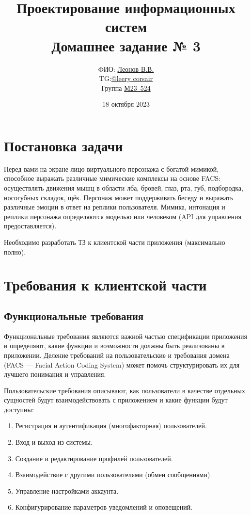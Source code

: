 \documentclass[a4paper,14pt]{extarticle}
\title{Проектирование информационных систем  \\
Домашнее задание № 3}
\author{ФИО: \underline{Леонов В.В.}\\TG:\underline{@leery\underline{ }corsair}\\Группа \underline{М23--524}}
\date{18 октября 2023}
\begin{document}
\maketitle

\tableofcontents
\newpage
\begin{spacing}{1.5}

\section{Постановка задачи}

\hspace{\parindent} Перед вами на экране лицо виртуального персонажа с богатой мимикой, способное выражать различные мимические комплексы на основе FACS: осуществлять движения мышц в области лба, бровей, глаз, рта, губ, подбородка, носогубных складок, щёк. Персонаж может поддерживать беседу и выражать различные эмоции в ответ на реплики пользователя. Мимика, интонация и реплики персонажа определяются моделью или человеком (API для управления предоставляется). 

Необходимо разработать ТЗ к клиентской части приложения (максимально полно).

\section{Требования к клиентской части}

\subsection{Функциональные требования}

\hspace{\parindent} Функциональные требования являются важной частью спецификации приложения и определяют, какие функции и возможности должны быть реализованы в приложении. Деление требований на пользовательские и требования домена (FACS --- Facial Action Coding System) может помочь структурировать их для лучшего понимания и управления.

Пользовательские требования описывают, как пользователи в качестве отдельных сущностей будут взаимодействовать с приложением и какие функции будут доступны:
\begin{enumerate}[label*=\arabic*.]
    \item Регистрация и аутентификация (многофакторная) пользователей.
    \item Вход и выход из системы.
    \item Создание и редактирование профилей пользователей.
    \item Взаимодействие с другими пользователями (обмен сообщениями).
    \item Управление настройками аккаунта.
    \item Конфигурирование параметров уведомлений и оповещений.
\end{enumerate}


\end{spacing}
\end{document}
